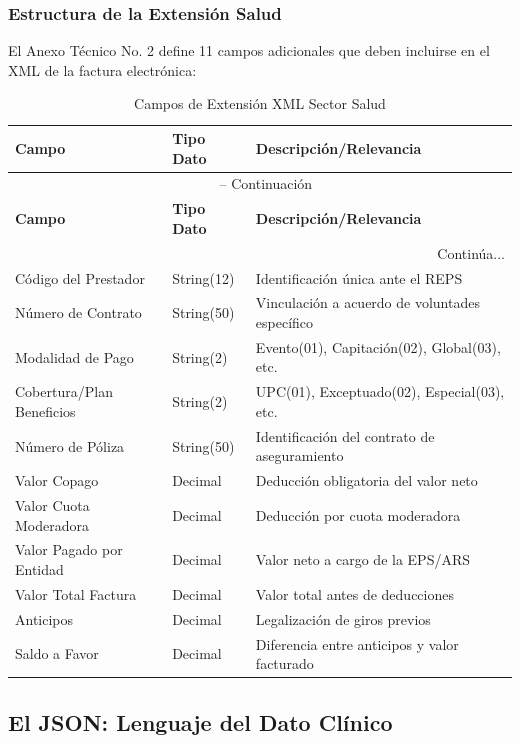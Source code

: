 \documentclass[12pt,letterpaper]{report}
\begin{document}
\subsubsection{Estructura de la Extensión Salud}

El Anexo Técnico No. 2 define 11 campos adicionales que deben incluirse en el XML de la factura electrónica:

\begin{longtable}{@{}p{4.5cm}p{3cm}p{6cm}@{}}
\caption{Campos de Extensión XML Sector Salud}\\
\toprule
\textbf{Campo} & \textbf{Tipo Dato} & \textbf{Descripción/Relevancia} \\
\midrule
\endfirsthead
\multicolumn{3}{c}{{\tablename\ \thetable{} -- Continuación}}\\
\toprule
\textbf{Campo} & \textbf{Tipo Dato} & \textbf{Descripción/Relevancia} \\
\midrule
\endhead
\midrule
\multicolumn{3}{r}{{Continúa...}}\\
\endfoot
\bottomrule
\endlastfoot
Código del Prestador & String(12) & Identificación única ante el REPS \\
Número de Contrato & String(50) & Vinculación a acuerdo de voluntades específico \\
Modalidad de Pago & String(2) & Evento(01), Capitación(02), Global(03), etc. \\
Cobertura/Plan Beneficios & String(2) & UPC(01), Exceptuado(02), Especial(03), etc. \\
Número de Póliza & String(50) & Identificación del contrato de aseguramiento \\
Valor Copago & Decimal & Deducción obligatoria del valor neto \\
Valor Cuota Moderadora & Decimal & Deducción por cuota moderadora \\
Valor Pagado por Entidad & Decimal & Valor neto a cargo de la EPS/ARS \\
Valor Total Factura & Decimal & Valor total antes de deducciones \\
Anticipos & Decimal & Legalización de giros previos \\
Saldo a Favor & Decimal & Diferencia entre anticipos y valor facturado \\
\end{longtable}

\subsection{El JSON: Lenguaje del Dato Clínico}
\end{document}
